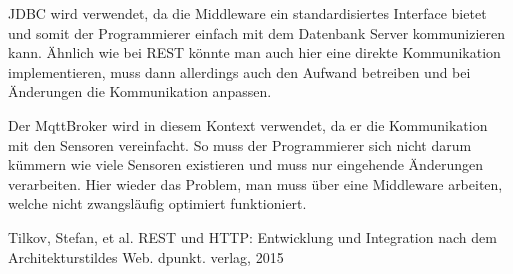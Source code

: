 \documentclass[runningheads]{llncs}
\begin{document}
JDBC wird verwendet, da die Middleware ein standardisiertes Interface bietet und somit der Programmierer einfach mit dem Datenbank Server kommunizieren kann.
Ähnlich wie bei REST könnte man auch hier eine direkte Kommunikation implementieren, muss dann allerdings auch den Aufwand betreiben und bei Änderungen die Kommunikation anpassen.

Der MqttBroker wird in diesem Kontext verwendet, da er die Kommunikation mit den Sensoren vereinfacht.
So muss der Programmierer sich nicht darum kümmern wie viele Sensoren existieren und muss nur eingehende Änderungen verarbeiten.
Hier wieder das Problem, man muss über eine Middleware arbeiten, welche nicht zwangsläufig optimiert funktioniert.


\newpage

Tilkov, Stefan, et al. REST und HTTP: Entwicklung und 
Integration nach dem Architekturstildes Web. dpunkt. verlag, 
2015

\end{document}
